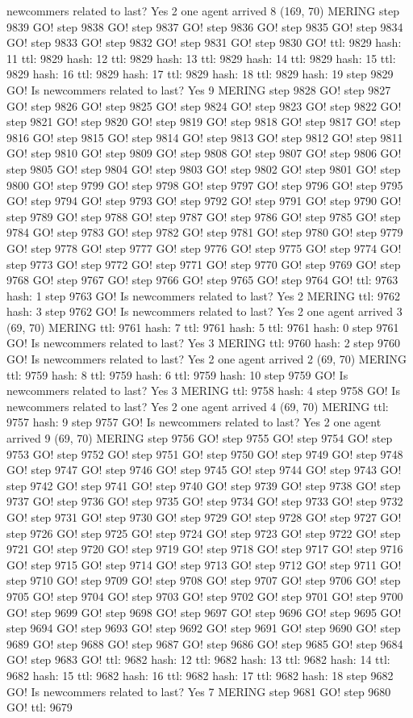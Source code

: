 newcommers related to last? Yes 2 one agent arrived 8 (169, 70) MERING step 9839 GO! step 9838 GO! step 9837 GO! step 9836 GO! step 9835 GO! step 9834 GO! step 9833 GO! step 9832 GO! step 9831 GO! step 9830 GO! ttl: 9829 hash: 11 ttl: 9829 hash: 12 ttl: 9829 hash: 13 ttl: 9829 hash: 14 ttl: 9829 hash: 15 ttl: 9829 hash: 16 ttl: 9829 hash: 17 ttl: 9829 hash: 18 ttl: 9829 hash: 19 step 9829 GO! Is newcommers related to last? Yes 9 MERING step 9828 GO! step 9827 GO! step 9826 GO! step 9825 GO! step 9824 GO! step 9823 GO! step 9822 GO! step 9821 GO! step 9820 GO! step 9819 GO! step 9818 GO! step 9817 GO! step 9816 GO! step 9815 GO! step 9814 GO! step 9813 GO! step 9812 GO! step 9811 GO! step 9810 GO! step 9809 GO! step 9808 GO! step 9807 GO! step 9806 GO! step 9805 GO! step 9804 GO! step 9803 GO! step 9802 GO! step 9801 GO! step 9800 GO! step 9799 GO! step 9798 GO! step 9797 GO! step 9796 GO! step 9795 GO! step 9794 GO! step 9793 GO! step 9792 GO! step 9791 GO! step 9790 GO! step 9789 GO! step 9788 GO! step 9787 GO! step 9786 GO! step 9785 GO! step 9784 GO! step 9783 GO! step 9782 GO! step 9781 GO! step 9780 GO! step 9779 GO! step 9778 GO! step 9777 GO! step 9776 GO! step 9775 GO! step 9774 GO! step 9773 GO! step 9772 GO! step 9771 GO! step 9770 GO! step 9769 GO! step 9768 GO! step 9767 GO! step 9766 GO! step 9765 GO! step 9764 GO! ttl: 9763 hash: 1 step 9763 GO! Is newcommers related to last? Yes 2 MERING ttl: 9762 hash: 3 step 9762 GO! Is newcommers related to last? Yes 2 one agent arrived 3 (69, 70) MERING ttl: 9761 hash: 7 ttl: 9761 hash: 5 ttl: 9761 hash: 0 step 9761 GO! Is newcommers related to last? Yes 3 MERING ttl: 9760 hash: 2 step 9760 GO! Is newcommers related to last? Yes 2 one agent arrived 2 (69, 70) MERING ttl: 9759 hash: 8 ttl: 9759 hash: 6 ttl: 9759 hash: 10 step 9759 GO! Is newcommers related to last? Yes 3 MERING ttl: 9758 hash: 4 step 9758 GO! Is newcommers related to last? Yes 2 one agent arrived 4 (69, 70) MERING ttl: 9757 hash: 9 step 9757 GO! Is newcommers related to last? Yes 2 one agent arrived 9 (69, 70) MERING step 9756 GO! step 9755 GO! step 9754 GO! step 9753 GO! step 9752 GO! step 9751 GO! step 9750 GO! step 9749 GO! step 9748 GO! step 9747 GO! step 9746 GO! step 9745 GO! step 9744 GO! step 9743 GO! step 9742 GO! step 9741 GO! step 9740 GO! step 9739 GO! step 9738 GO! step 9737 GO! step 9736 GO! step 9735 GO! step 9734 GO! step 9733 GO! step 9732 GO! step 9731 GO! step 9730 GO! step 9729 GO! step 9728 GO! step 9727 GO! step 9726 GO! step 9725 GO! step 9724 GO! step 9723 GO! step 9722 GO! step 9721 GO! step 9720 GO! step 9719 GO! step 9718 GO! step 9717 GO! step 9716 GO! step 9715 GO! step 9714 GO! step 9713 GO! step 9712 GO! step 9711 GO! step 9710 GO! step 9709 GO! step 9708 GO! step 9707 GO! step 9706 GO! step 9705 GO! step 9704 GO! step 9703 GO! step 9702 GO! step 9701 GO! step 9700 GO! step 9699 GO! step 9698 GO! step 9697 GO! step 9696 GO! step 9695 GO! step 9694 GO! step 9693 GO! step 9692 GO! step 9691 GO! step 9690 GO! step 9689 GO! step 9688 GO! step 9687 GO! step 9686 GO! step 9685 GO! step 9684 GO! step 9683 GO! ttl: 9682 hash: 12 ttl: 9682 hash: 13 ttl: 9682 hash: 14 ttl: 9682 hash: 15 ttl: 9682 hash: 16 ttl: 9682 hash: 17 ttl: 9682 hash: 18 step 9682 GO! Is newcommers related to last? Yes 7 MERING step 9681 GO! step 9680 GO! ttl: 9679 
